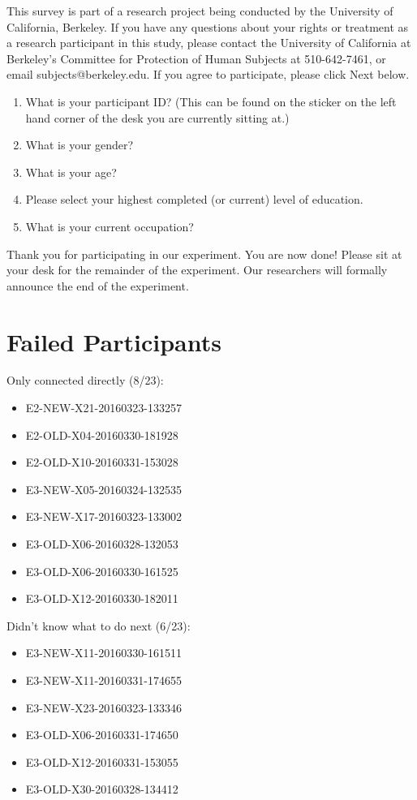 \documentclass[USenglish,oneside,twocolumn]{article}
\begin{document}
This survey is part of a research project being conducted by the University of California, Berkeley. If you have any questions about your rights or treatment as a research participant in this study, please contact the University of California at Berkeley's Committee for Protection of Human Subjects at 510-642-7461, or email subjects@berkeley.edu. If you agree to participate, please click Next below.\\

\begin{enumerate}
\item{What is your participant ID? (This can be found on the sticker on the left hand corner of the desk you are currently sitting at.)}
\item{What is your gender?}
\item{What is your age?}
\item{Please select your highest completed (or current) level of education}.
\item{What is your current occupation?}  
\end{enumerate}

Thank you for participating in our experiment. You are now done! Please sit at your desk for the remainder of the experiment. Our researchers will formally announce the end of the experiment. 

\section{Failed Participants} 
\label{failed-participants}

Only connected directly (8/23): 
\begin{itemize}
\item E2-NEW-X21-20160323-133257 
\item E2-OLD-X04-20160330-181928
\item E2-OLD-X10-20160331-153028
\item E3-NEW-X05-20160324-132535
\item E3-NEW-X17-20160323-133002
\item E3-OLD-X06-20160328-132053
\item E3-OLD-X06-20160330-161525 
\item E3-OLD-X12-20160330-182011
\end{itemize} 

Didn't know what to do next (6/23): 
\begin{itemize}
\item E3-NEW-X11-20160330-161511
\item E3-NEW-X11-20160331-174655
\item E3-NEW-X23-20160323-133346
\item E3-OLD-X06-20160331-174650
\item E3-OLD-X12-20160331-153055
\item E3-OLD-X30-20160328-134412
\end{itemize} 
\end{document}
